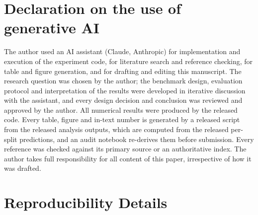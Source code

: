 \documentclass[11pt]{article}
\begin{document}
\section*{Declaration on the use of generative AI}
The author used an AI assistant (Claude, Anthropic) for implementation and execution of the experiment code, for
literature search and reference checking, for table and figure generation, and for drafting and editing this
manuscript. The research question was chosen by the author; the benchmark design, evaluation protocol and
interpretation of the results were developed in iterative discussion with the assistant, and every design decision and
conclusion was reviewed and approved by the author. All numerical results were produced by the released code. Every
table, figure and in-text number is generated by a released script from the released analysis outputs, which are
computed from the released per-split predictions, and an audit notebook re-derives them before submission. Every
reference was checked against its primary source or an authoritative index. The author takes full responsibility for
all content of this paper, irrespective of how it was drafted.




\appendix
\section{Reproducibility Details}\label{app:repro}
\end{document}
